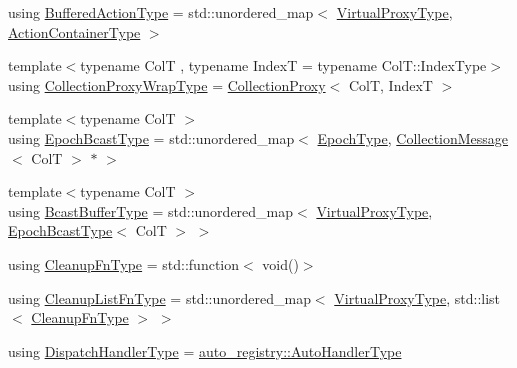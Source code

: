 \begin{DoxyCompactItemize}
\item 
using \hyperlink{structvt_1_1vrt_1_1collection_1_1_collection_manager_a7b32db0e6ccafa771ddd72f534a1cf8c}{Buffered\+Action\+Type} = std\+::unordered\+\_\+map$<$ \hyperlink{namespacevt_a1b417dd5d684f045bb58a0ede70045ac}{Virtual\+Proxy\+Type}, \hyperlink{structvt_1_1vrt_1_1collection_1_1_collection_manager_a536805fb5c58b557b66e7d7febe87567}{Action\+Container\+Type} $>$
\item 
{\footnotesize template$<$typename ColT , typename IndexT  = typename Col\+T\+::\+Index\+Type$>$ }\\using \hyperlink{structvt_1_1vrt_1_1collection_1_1_collection_manager_a56458ed7f9bb22b631b9b3a745f42f94}{Collection\+Proxy\+Wrap\+Type} = \hyperlink{structvt_1_1vrt_1_1collection_1_1_collection_proxy}{Collection\+Proxy}$<$ ColT, IndexT $>$
\item 
{\footnotesize template$<$typename ColT $>$ }\\using \hyperlink{structvt_1_1vrt_1_1collection_1_1_collection_manager_ade4647c26f1f20016fa0520bea640f59}{Epoch\+Bcast\+Type} = std\+::unordered\+\_\+map$<$ \hyperlink{namespacevt_a985a5adf291c34a3ca263b3378388236}{Epoch\+Type}, \hyperlink{structvt_1_1vrt_1_1collection_1_1_collection_message}{Collection\+Message}$<$ ColT $>$ $\ast$ $>$
\item 
{\footnotesize template$<$typename ColT $>$ }\\using \hyperlink{structvt_1_1vrt_1_1collection_1_1_collection_manager_af3a8c8a3c37301a98aa62f265858a3c0}{Bcast\+Buffer\+Type} = std\+::unordered\+\_\+map$<$ \hyperlink{namespacevt_a1b417dd5d684f045bb58a0ede70045ac}{Virtual\+Proxy\+Type}, \hyperlink{structvt_1_1vrt_1_1collection_1_1_collection_manager_ade4647c26f1f20016fa0520bea640f59}{Epoch\+Bcast\+Type}$<$ ColT $>$ $>$
\item 
using \hyperlink{structvt_1_1vrt_1_1collection_1_1_collection_manager_a95c122e5b83bc51c306c9367b8e62c07}{Cleanup\+Fn\+Type} = std\+::function$<$ void()$>$
\item 
using \hyperlink{structvt_1_1vrt_1_1collection_1_1_collection_manager_a735e54bc5a8646536d07750e2549a156}{Cleanup\+List\+Fn\+Type} = std\+::unordered\+\_\+map$<$ \hyperlink{namespacevt_a1b417dd5d684f045bb58a0ede70045ac}{Virtual\+Proxy\+Type}, std\+::list$<$ \hyperlink{structvt_1_1vrt_1_1collection_1_1_collection_manager_a95c122e5b83bc51c306c9367b8e62c07}{Cleanup\+Fn\+Type} $>$ $>$
\item 
using \hyperlink{structvt_1_1vrt_1_1collection_1_1_collection_manager_a0cfe02a0426e95ec9daa2ef7374e07c7}{Dispatch\+Handler\+Type} = \hyperlink{namespacevt_1_1auto__registry_ae295e18699146815bb7d7674594d95d7}{auto\+\_\+registry\+::\+Auto\+Handler\+Type}

\end{DoxyCompactItemize}
